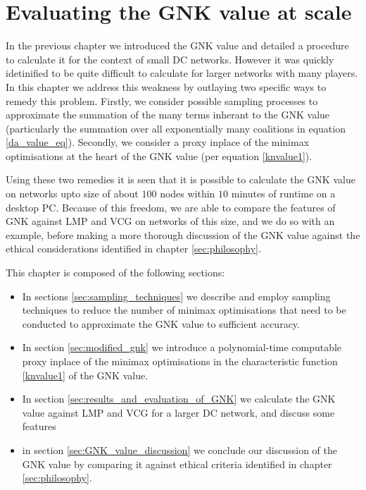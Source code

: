 



\chapter{Evaluating the GNK value at scale}\label{sec:scaling}

In the previous chapter we introduced the GNK value and detailed a procedure to calculate it for the context of small DC networks.
However it was quickly idetinified to be quite difficult to calculate for larger networks with many players.
In this chapter we address this weakness by outlaying two specific ways to remedy this problem.
Firstly, we consider possible sampling processes to approximate the summation of the many terms inherant to the GNK value (particularly the summation over all exponentially many coalitions in equation \ref{da_value_eq}).
Secondly, we consider a proxy inplace of the minimax optimisations at the heart of the GNK value (per equation \ref{knvalue1}).

Using these two remedies it is seen that it is possible to calculate the GNK value on networks upto size of about $100$ nodes within $10$ minutes of runtime on a desktop PC.
Because of this freedom, we are able to compare the features of GNK against LMP and VCG on networks of this size, and we do so with an example, before making a more thorough discussion of the GNK value against the ethical considerations identified in chapter \ref{sec:philosophy}.

This chapter is composed of the following sections:
\begin{itemize}
    \item In sections \ref{sec:sampling_techniques} we describe and employ sampling techniques to reduce the number of minimax optimisations that need to be conducted to approximate the GNK value to sufficient accuracy.
    \item In section \ref{sec:modified_gnk} we introduce a polynomial-time computable proxy inplace of the minimax optimisations in the characteristic function \eqref{knvalue1} of the GNK value.
    \item In section \ref{sec:results_and_evaluation_of_GNK} we calculate the GNK value against LMP and VCG for a larger DC network, and discuss some features
    \item in section \ref{sec:GNK_value_discussion} we conclude our discussion of the GNK value by comparing it against ethical criteria identified in chapter \ref{sec:philosophy}.
\end{itemize}

